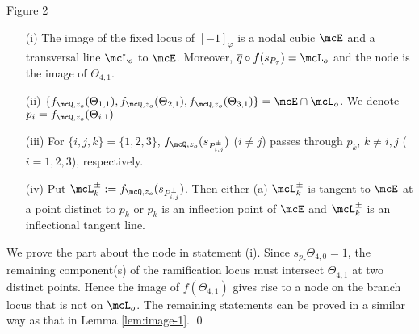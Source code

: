 \begin{center}


Figure 2
\end{center}


\begin{lem}\label{lem:image-2}{
\begin{enumerate}
 \item[(i)]  The image of the fixed locus of $[-1]_{\varphi}$ is a nodal cubic $\mcE$ and a transversal line $\mcL_o$ to $\mcE$. Moreover, $\overline {q}\circ f(s_{P_{\tau}}) = \mcL_o$ and the node is the image of $\Theta_{4,1}$.
 
 \item[(ii)]  $\{f_{\mcQ, z_o}(\Theta_{1,1}), f_{\mcQ, z_o}(\Theta_{2,1}), f_{\mcQ, z_o}(\Theta_{3,1})\} =
 \mcE\cap \mcL_o$. We denote $p_i = f_{\mcQ, z_o}(\Theta_{i,1})$
 
\item[(iii)]  For $\{i,j,k\}=\{1,2,3\}$, $f_{\mcQ, z_o}(s_{P_{i,j}^\pm})$ ($i\not=j$) passes through $p_k$, $k\not=i,j$ ($i = 1, 2, 3$), respectively.
 
 
 \item[(iv)] Put $\mcL_k^\pm := f_{\mcQ, z_o}(s_{P_{i,j}^\pm})$.  Then   either
 (a) $\mcL_k^\pm$ is tangent to $\mcE$ at a point distinct to $p_k$  or 
 $p_k$  is an inflection point of $\mcE$ and $\mcL_k^\pm$ is
 an inflectional tangent line.
 
 \end{enumerate}
 }
 \end{lem}

\proof We prove the part about the node in statement (i). Since $s_{p_\tau}\Theta_{4,0}=1$, the remaining component(s) of the ramification locus must intersect $\Theta_{4,1}$ at two distinct points. Hence the image of $f(\Theta_{4,1})$ gives rise to a node on  the branch locus that is not on $\mcL_o$. The remaining statements can be proved in a similar way as that in Lemma \ref{lem:image-1}.  
\qed


